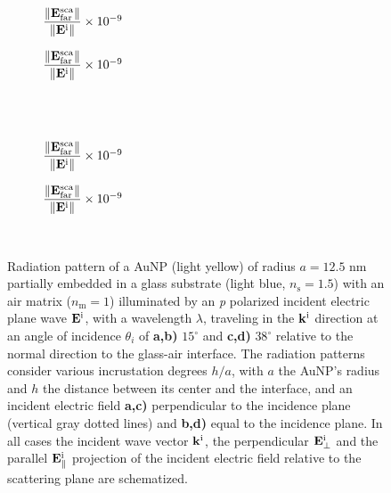 \begin{figure}[h!]
    \centering
    \def\svgwidth{.8\textwidth}
    \hspace*{-.2\textwidth}%
    \vspace*{-3.65em}%
        \begin{subfigure}{.375\textwidth}\caption{%
                    \footnotesize$\dfrac{\norm{\vb{E}^\text{sca}_\text{far}}}{\norm{\vb{E}^\text{i}}} \times 10^{-9}$  }\label{sfig:Far:Inc:p1:a}\end{subfigure}%
        \begin{subfigure}{.4\textwidth}\caption{%
                    \footnotesize$\dfrac{\norm{\vb{E}^\text{sca}_\text{far}}}{\norm{\vb{E}^\text{i}}} \times 10^{-9}$  }\label{sfig:Far:Inc:p1:b}\end{subfigure}\\
    \\[-.75em]
    \def\svgwidth{.8\textwidth}
    \hspace*{-.21\textwidth}%
    \vspace*{-.7em}%
        \begin{subfigure}{.4\textwidth}\caption{%
                    \footnotesize$\dfrac{\norm{\vb{E}^\text{sca}_\text{far}}}{\norm{\vb{E}^\text{i}}} \times 10^{-9}$  }\label{sfig:Far:Inc:p1:c}\end{subfigure}%
        \begin{subfigure}{.4\textwidth}\caption{%
                    \footnotesize$\dfrac{\norm{\vb{E}^\text{sca}_\text{far}}}{\norm{\vb{E}^\text{i}}} \times 10^{-9}$  }\label{sfig:Far:Inc:p1:d}\end{subfigure}\\
    \caption[  Radiation pattern of a AuNP supported on a substrate illuminated at oblique incidence ]{
    Radiation pattern of a AuNP (light yellow) of radius $a = 12.5$ nm partially embedded in a glass substrate (light blue, $n_\text{s} = 1.5$) with an air matrix ($n_\text{m} = 1$) illuminated by an \textit{p} polarized incident electric plane wave $\vb{E}^\text{i}$, with a wavelength $\lambda$, traveling in the $\vb{k}^\text{i}$ direction at an angle of incidence $\theta_i$ of \textbf{a,b)} $15^\circ$ and \textbf{c,d)} $38^\circ$ relative to the normal direction to the glass-air interface. The radiation patterns consider various incrustation degrees $h/a$, with $a$ the AuNP's radius and $h$ the distance between its center and the interface, and an  incident electric field \textbf{a,c)} perpendicular to the incidence plane (vertical gray dotted lines) and \textbf{b,d)} equal to the incidence plane. In all cases the incident wave vector $\vb{k}^\text{i}$, the perpendicular $\vb{E}_\perp^\text{i}$ and the  parallel $\vb{E}_\parallel^\text{i}$ projection of the incident electric field relative to the scattering plane are schematized.%
    }
    \label{fig:Far:Inc:p1}
\end{figure}


